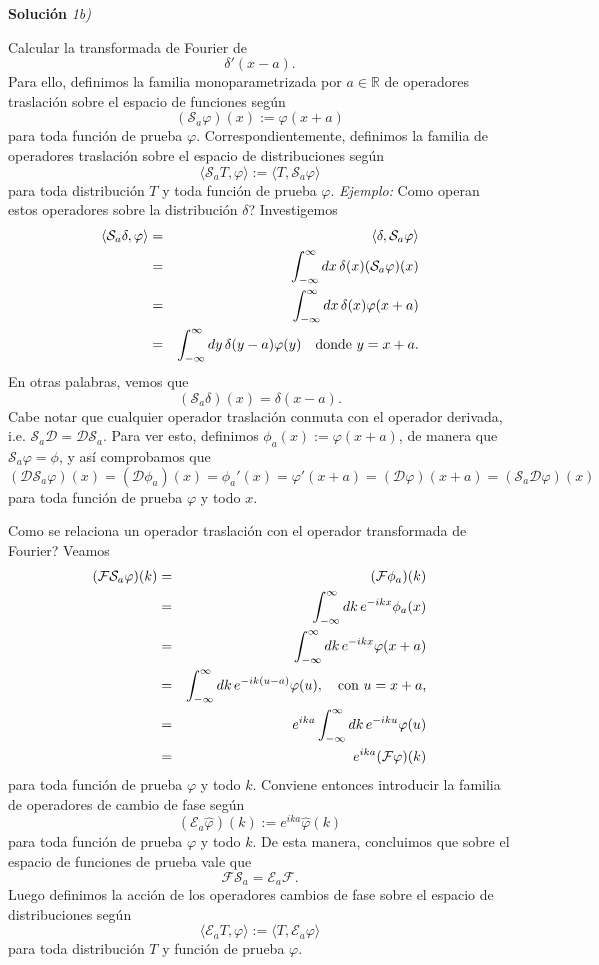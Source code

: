\documentclass[11pt,spanish]{article}
\newcommand{\four}{\mathcal{F}}
\newcommand{\derv}{\mathcal{D}}
\newcommand{\tras}{\mathcal{S}}
\newcommand{\phas}{\mathcal{E}}
\newcommand{\RR}{\mathbb{R}}
\begin{document}
\vspace{0.5cm}
{\bf Soluci\'on }{\em 1b)}
\vspace{0.5cm}

Calcular la transformada de Fourier de
$$
\delta'(x-a).
$$
Para ello, definimos la familia monoparametrizada por $a\in \RR$ de operadores traslaci\'on sobre el espacio de funciones seg\'un
$$
(\tras_a \varphi)(x)
:=
\varphi(x+a)
$$
para toda funci\'on de prueba $\varphi$.
Correspondientemente, definimos la familia de operadores traslaci\'on sobre el espacio de distribuciones seg\'un
$$
\langle \tras_a T,\varphi \rangle
:=
\langle T,\tras_a \varphi \rangle
$$
para toda distribuci\'on $T$ y toda funci\'on de prueba $\varphi$.
{\em Ejemplo:} Como operan estos operadores sobre la distribuci\'on $\delta$?
Investigemos
\begin{eqnarray}
\langle \tras_a \delta,\varphi \rangle
&=&
\langle \delta,\tras_a \varphi \rangle
\notag
\\
&=&
\int_{-\infty}^{\infty} 
dx\,
\delta(x)
(\tras_a \varphi)(x)
\notag
\\
&=&
\int_{-\infty}^{\infty} 
dx\,
\delta(x)
\varphi(x+a)
\notag
\\
&=&
\int_{-\infty}^{\infty} 
dy\,
\delta(y-a)
\varphi(y)
\quad \text{donde $y=x+a$.}
\notag
\end{eqnarray}
En otras palabras, vemos que
$$
(\tras_a \delta)(x)
=
\delta(x-a).
$$
Cabe notar que cualquier operador traslaci\'on conmuta con el operador derivada, i.e. $\tras_a \derv = \derv \tras_a$.
Para ver esto, definimos $\phi_a(x):=\varphi(x+a)$, de manera que $\tras_a \varphi = \phi$, y as\'i comprobamos que
$$
(\derv \tras_a \varphi)(x)
=
(\derv \phi_a)(x)
=
\phi_a'(x)
=
\varphi'(x+a)
=
(\derv \varphi)(x+a)
=
(\tras_a \derv \varphi)(x)
$$
para toda funci\'on de prueba $\varphi$ y todo $x$.

Como se relaciona un operador traslaci\'on con el operador transformada de Fourier?
Veamos
\begin{eqnarray}
(\four \tras_a \varphi)(k)
&=&
(\four \phi_a)(k)
\notag
\\
&=&
\int_{-\infty}^{\infty}
dk\,
e^{-ikx}
\phi_a(x)
\notag
\\
&=&
\int_{-\infty}^{\infty}
dk\,
e^{-ikx}
\varphi(x+a)
\notag
\\
&=&
\int_{-\infty}^{\infty}
dk\,
e^{-ik(u-a)}
\varphi(u),
\quad \text{con $u=x+a$,}
\notag
\\
&=&
e^{ika}
\int_{-\infty}^{\infty}
dk\,
e^{-iku}
\varphi(u)
\notag
\\
&=&
e^{ika}
(\four \varphi)(k)
\notag
\end{eqnarray}
para toda funci\'on de prueba $\varphi$ y todo $k$.
Conviene entonces introducir la familia de operadores de cambio de fase seg\'un
$$
(\phas_a \hat{\varphi})(k)
:=
e^{ika} \hat{\varphi}(k)
$$
para toda funci\'on de prueba $\varphi$ y todo $k$.
De esta manera, concluimos que sobre el espacio de funciones de prueba vale que
$$
\four \tras_a
=
\phas_a \four
.
$$
Luego definimos la acci\'on de los operadores cambios de fase sobre el espacio de distribuciones seg\'un
$$
\langle \phas_a T,\varphi \rangle
:=
\langle T,\phas_a \varphi \rangle
$$
para toda distribuci\'on $T$ y funci\'on de prueba $\varphi$.
\end{document}
